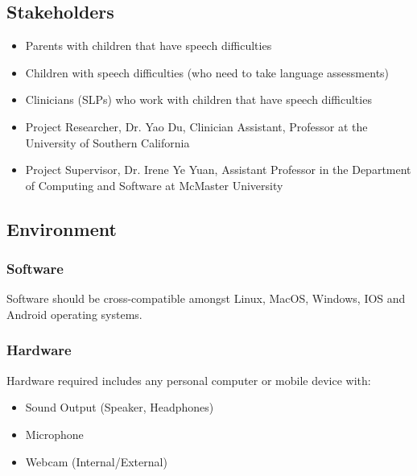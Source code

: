 \documentclass{article}
\begin{document}
\subsection{Stakeholders}
\begin{itemize}
    \item Parents with children that have speech difficulties
    \item Children with speech difficulties (who need to take language assessments)
    \item Clinicians (SLPs) who work with children that have speech difficulties
    \item Project Researcher, Dr. Yao Du, Clinician Assistant, Professor at the University of Southern California
    \item Project Supervisor, Dr. Irene Ye Yuan, Assistant Professor in the Department of Computing and Software at McMaster University
\end{itemize}

\subsection{Environment}
\subsubsection{Software}
Software should be cross-compatible amongst Linux, MacOS, Windows, IOS and Android operating systems.
\subsubsection{Hardware}
Hardware required includes any personal computer or mobile device with:
\begin{itemize}
    \item Sound Output (Speaker, Headphones)
    \item Microphone
    \item Webcam (Internal/External)
\end{itemize}
\end{document}
